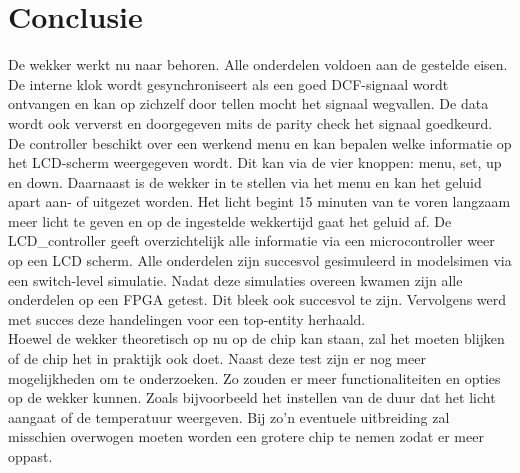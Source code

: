 \chapter{Conclusie}

De wekker werkt nu naar behoren. Alle onderdelen voldoen aan de gestelde eisen. De interne klok wordt gesynchroniseert als een goed DCF-signaal wordt ontvangen en kan op zichzelf door tellen mocht het signaal wegvallen. De data wordt ook ververst en doorgegeven mits de parity check het signaal goedkeurd. De controller beschikt over een werkend menu en kan bepalen welke informatie op het LCD-scherm weergegeven wordt. Dit kan via de vier knoppen: menu, set, up en down. Daarnaast is de wekker in te stellen via het menu en kan het geluid apart aan- of uitgezet worden. Het licht begint 15 minuten van te voren langzaam meer licht te geven en op de ingestelde wekkertijd gaat het geluid af.  De LCD\_controller geeft overzichtelijk alle informatie via een microcontroller weer op een LCD scherm.
Alle onderdelen zijn succesvol gesimuleerd in modelsim\textregistered en via een switch-level simulatie. Nadat deze simulaties overeen kwamen zijn alle onderdelen op een FPGA getest. Dit bleek ook succesvol te zijn. Vervolgens werd met succes deze handelingen voor een top-entity herhaald.
\\
Hoewel de wekker theoretisch op nu op de chip kan staan, zal het moeten blijken of de chip het in praktijk ook doet. Naast deze test zijn er nog meer mogelijkheden om te onderzoeken. Zo zouden er meer functionaliteiten en opties op de wekker kunnen. Zoals bijvoorbeeld het instellen van de duur dat het licht aangaat of de temperatuur weergeven. Bij zo'n eventuele uitbreiding zal misschien overwogen moeten worden een grotere chip te nemen zodat er meer oppast.